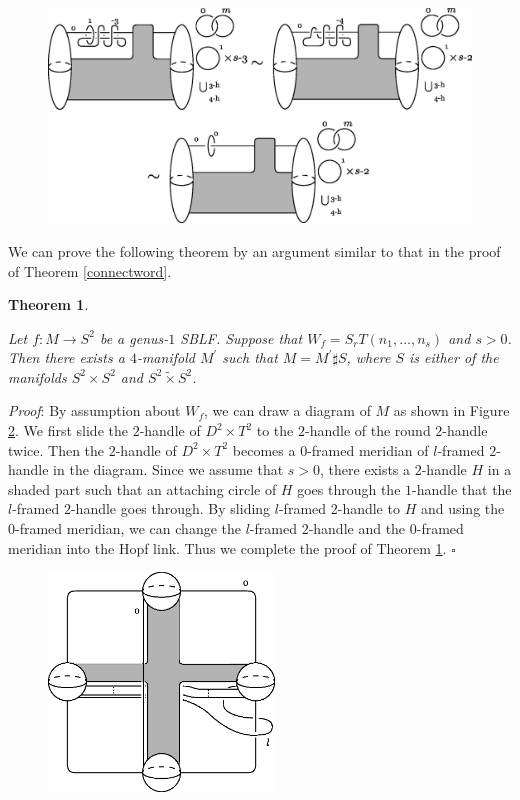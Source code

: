 \documentclass{amsart}
\theoremstyle{plain}
\newtheorem{thm}{Theorem}[section]
\theoremstyle{definition}
\begin{document}
\begin{figure}[htbp]
\begin{center}
\includegraphics[width=140mm]{movesWT_s.eps}
\end{center}
\caption{}
\label{movesWT_s}
\end{figure}

We can prove the following theorem by an argument similar to that in the proof of Theorem \ref{connectword}. 

\begin{thm}\label{indef}

Let $f:M\rightarrow S^2$ be a genus-$1$ SBLF. 
Suppose that $W_f=S_rT(n_1,\ldots,n_s)$ and $s>0$. 
Then there exists a $4$-manifold $M^\prime$ such that $M=M^\prime\sharp S$, where $S$ is either of the manifolds $S^2\times S^2$ and $S^2\tilde{\times}S^2$. 

\end{thm}

{\it Proof}: By assumption about $W_f$, we can draw a diagram of $M$ as shown in Figure \ref{indefinite}. 
We first slide the $2$-handle of $D^2\times T^2$ to the $2$-handle of the round $2$-handle twice. 
Then the $2$-handle of $D^2\times T^2$ becomes a $0$-framed meridian of $l$-framed $2$-handle in the diagram. 
Since we assume that $s>0$, there exists a $2$-handle $H$ in a shaded part such that an attaching circle of $H$ goes through the $1$-handle that the $l$-framed $2$-handle goes through. 
By sliding $l$-framed $2$-handle to $H$ and using the $0$-framed meridian, we can change the $l$-framed $2$-handle and the $0$-framed meridian into the Hopf link. 
Thus we complete the proof of Theorem \ref{indef}.  \hfill $\square$

\begin{figure}[htbp]
\begin{center}
\includegraphics[width=60mm]{indefinite.eps}
\end{center}
\caption{}
\label{indefinite}
\end{figure}
\end{document}
